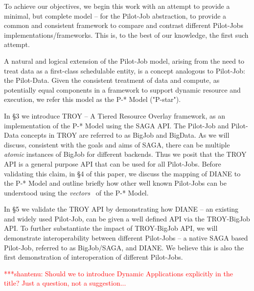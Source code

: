 \documentclass[conference,final]{IEEEtran}
\newcommand{\jhanote}[1]{ {\textcolor{red} { ***shantenu: #1 }}}
\newcommand{\jhanote}[1]{}
\begin{document}


To achieve our objectives, we begin this work with an attempt to
provide a minimal, but complete model -- for the Pilot-Job
abstraction, to provide a common and consistent framework to compare
and contrast different Pilot-Jobs implementations/frameworks. This is,
to the best of our knowledge, the first such attempt.

A natural and logical extension of the Pilot-Job model, arising from
the need to treat data as a first-class schedulable entity, is a
concept analogous to Pilot-Job: the Pilot-Data. Given the consistent
treatment of data and compute, as potentially equal components in a
framework to support dynamic resource and execution, we refer this
model as the P-* Model ("P-star").

In \S3 we introduce TROY -- A Tiered Resource Overlay framework, as an
implementation of the P-* Model using the SAGA API. The Pilot-Job and
Pilot-Data concepts in TROY are referred to as BigJob and BigData. As
we will discuss, consistent with the goals and aims of SAGA, there can
be multiple {\it atomic} instances of BigJob for different backends.
Thus we posit that the TROY API is a general purpose API that can be
used for all Pilot-Jobs. Before validating this claim, in \S4 of this
paper, we discuss the mapping of DIANE to the P-* Model and outline
briefly how other well known Pilot-Jobs can be understood using the
{\it vectors}~\cite{dpa_surveypaper} of the P-* Model.

In \S5 we validate the TROY API by demonstrating how DIANE -- an
existing and widely used Pilot-Job, can be given a well defined API
via the TROY-BigJob API. To further substantiate the impact of
TROY-BigJob API, we will demonstrate interoperability between
different Pilot-Jobs -- a native SAGA based Pilot-Job, referred to as
BigJob/SAGA, and DIANE.  We believe this is also the first
demonstration of interoperation of different Pilot-Jobs.

\jhanote{Should we to introduce Dynamic Applications explicitly in the
  title? Just a question, not a suggestion...}

\end{document}
